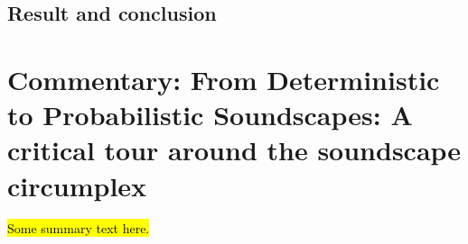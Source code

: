 \documentclass[oneside,fontsize=12pt,titlepage]{scrbook}
\begin{document}
\section*{Result and conclusion}

 

 \chapter[Commentary: Probabilistic Soundscapes]{Commentary: From Deterministic to Probabilistic Soundscapes: A critical tour around the soundscape circumplex}

 \hl{Some summary text here.}

 





 




 \backmatter
 \printglossaries

 

\end{document}
